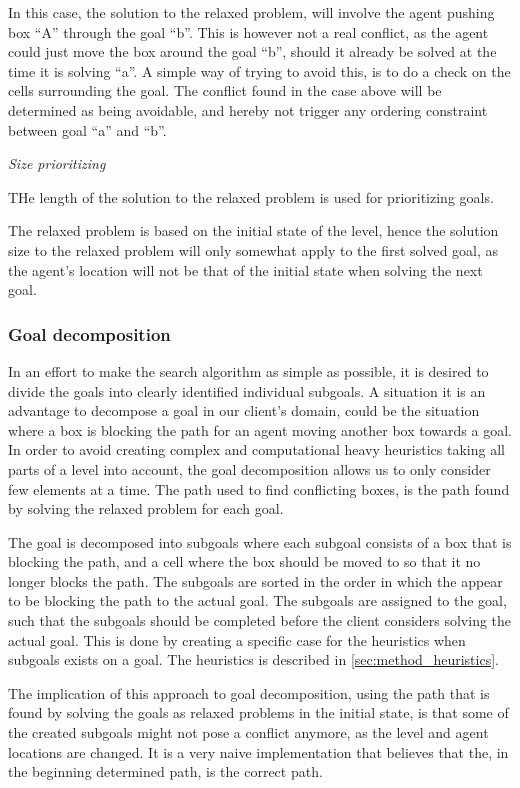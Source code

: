 \documentclass[Main]{subfiles}
\begin{document}
In this case, the solution to the relaxed problem, will involve the agent pushing box ``A'' through the goal ``b''. This is however not a real conflict, as the agent could just move the box around the goal ``b'', should it already be solved at the time it is solving ``a''. A simple way of trying to avoid this, is to do a check on the cells surrounding the goal. 
The conflict found in the case above will be determined as being avoidable, and hereby not trigger any ordering constraint between goal ``a'' and ``b''. 


\textit{Size prioritizing} 

THe length of the solution to the relaxed problem is used for prioritizing goals. 

The relaxed problem is based on the initial state of the level, hence the solution size to the relaxed problem will only somewhat apply to the first solved goal, as the agent's location will not be that of the initial state when solving the next goal. 



\subsubsection{Goal decomposition}
In an effort to make the search algorithm as simple as possible, it is desired to divide the goals into clearly identified individual subgoals. A situation it is an advantage to decompose a goal in our client's domain, could be the situation where a box is blocking the path for an agent moving another box towards a goal. In order to avoid creating complex and computational heavy heuristics taking all parts of a level into account, the goal decomposition allows us to only consider few elements at a time. The path used to find conflicting boxes, is the path found by solving the relaxed problem for each goal.

The goal is decomposed into subgoals where each subgoal consists of a box that is blocking the path, and a cell where the box should be moved to so that it no longer blocks the path. The subgoals are sorted in the order in which the appear to be blocking the path to the actual goal. The subgoals are assigned to the goal, such that the subgoals should be completed before the client considers solving the actual goal. This is done by creating a specific case for the heuristics when subgoals exists on a goal. The heuristics is described in \autoref{sec:method_heuristics}. 

The implication of this approach to goal decomposition, using the path that is found by solving the goals as relaxed problems in the initial state, is that some of the created subgoals might not pose a conflict anymore, as the level and agent locations are changed. It is a very naive implementation that believes that the, in the beginning determined path, is the correct path. 
\end{document}
